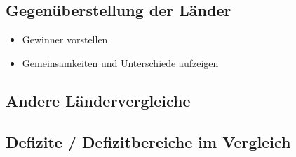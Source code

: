 \subsection{Gegenüberstellung der Länder}
\begin{itemize}
	\item Gewinner vorstellen
	\item Gemeinsamkeiten und Unterschiede aufzeigen
\end{itemize}
\subsection{Andere Ländervergleiche}
\subsection{Defizite / Defizitbereiche im Vergleich}